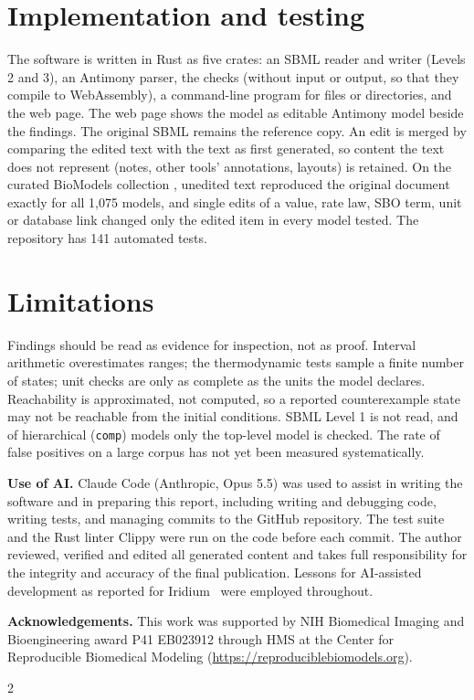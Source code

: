 \documentclass[10pt]{article}
\begin{document}
\section{Implementation and testing}
The software is written in Rust as five crates: an SBML reader and writer (Levels 2 and 3), an Antimony
\cite{smith2009antimony} parser, the checks (without input or output, so that they compile to WebAssembly),
a command-line program for files or directories, and the web page. The web page shows the model as editable Antimony model
beside the findings. The original SBML remains the reference copy. An edit is merged by comparing the edited
text with the text as first generated, so content the text does not represent (notes, other tools'
annotations, layouts) is retained. On the curated BioModels collection \cite{malik2020biomodels}, unedited text reproduced the
original document exactly for all 1,075 models, and single edits of a value, rate law, SBO term, unit or
database link changed only the edited item in every model tested. The repository has 141 automated tests.

\section{Limitations}
Findings should be read as evidence for
inspection, not as proof. Interval arithmetic overestimates ranges; the thermodynamic tests sample a finite
number of states; unit checks are only as complete as the units the model declares. Reachability is approximated, not computed, so
a reported counterexample state may not be reachable from the initial conditions. SBML Level 1 is not read, and of hierarchical (\texttt{comp}) models only the top-level model
is checked. The rate of false positives on a large corpus has not yet been measured systematically.

{\footnotesize
\textbf{Use of AI.} Claude Code (Anthropic, Opus 5.5) was used to assist in writing the software and in preparing this report,
including writing and debugging code, writing tests, and managing commits to the GitHub repository. The test
suite and the Rust linter Clippy were run on the code before each commit. The author reviewed, verified and
edited all generated content and takes full responsibility for the integrity and accuracy of the final
publication. Lessons for AI-assisted development as reported for Iridium~\cite{iridium2026} were employed
throughout.

\textbf{Acknowledgements.} This work was supported by NIH Biomedical Imaging and Bioengineering award P41 EB023912 through HMS at the
Center for Reproducible Biomedical Modeling (\url{https://reproduciblebiomodels.org}).
}

{\footnotesize
\begin{multicols}{2}


\end{multicols}
}
\end{document}
